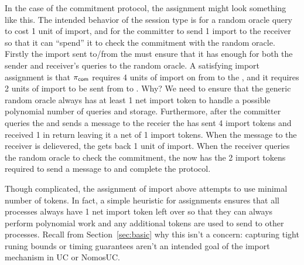 In the case of the commitment protocol, the assignment might look something like this.
The intended behavior of the session type is for a random oracle query to cost 1 unit of import, and for the committer to send 1 import to the receiver so that it can ``spend'' it to check the commitment with the random oracle. 
Firstly the import sent to/from the \partywrapper must ensure that it has enough for both the sender and receiver's queries to the random oracle. 
A satisfying import assignment is that $\pi_{{\mathsf {com}}}$ requires 4 units of import on  from \Z to the \partywrapper, and it requires 2 units of import to be sent from \partywrapper to \Fropp. Why?
We need to ensure that the generic random oracle always has at least 1 net import token to handle a possible polynomial number of queries and storage. 
Furthermore, after the committer queries the \Fro and sends a message to the receier the \partywrapper has sent 4 import tokens and received 1 in return leaving it a net of 1 import tokens. 
When the message to the receiver is delievered, the \partywrapper gets back 1 unit of import. When the receiver queries the random oracle to check the commitment, the \partywrapper now has the 2 import tokens required to send a message to \Fropp and complete the protocol. 

Though complicated, the assignment of import above attempts to use minimal number of tokens. In fact, a simple heuristic for assignments ensures that all processes always have 1 net import token left over so that they can always perform polynomial work and any additional tokens are used to send to other processes. 
Recall from Section~\ref{sec:basic} why this isn't a concern: capturing tight runing bounds or timing guarantees aren't an intended goal of the import mechanism in UC or NomosUC.

